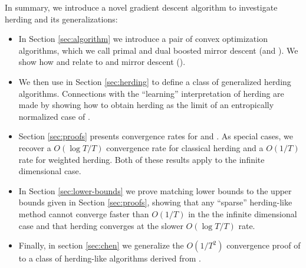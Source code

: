 \documentclass[paper.tex]{subfiles}
\begin{document}

In summary, we introduce a novel gradient descent algorithm to investigate herding and its generalizations:
\begin{itemize}
\item In Section \ref{sec:algorithm} we introduce a pair of convex optimization algorithms, which we call primal and dual boosted mirror descent (\primal and \dual). We show how \primal and \dual relate to \cgd and mirror descent (\md). 
\item We then use \dual in Section \ref{sec:herding} to define a class of generalized herding algorithms. Connections with the ``learning'' interpretation of herding are made by showing how to obtain herding as the limit of an entropically normalized case of \dual. 
\item Section \ref{sec:proofs} presents convergence rates for \primal and \dual. As special cases, we recover a $O(\log T/ T)$ convergence rate for classical herding and a $O(1/T)$ rate for weighted herding. Both of these results apply to the infinite dimensional case. 
\item In Section \ref{sec:lower-bounds} we prove matching lower bounds to the upper bounds given in Section \ref{sec:proofs}, showing that any ``sparse'' herding-like method cannot converge faster than $O(1/T)$ in the the infinite dimensional case and that herding converges at the slower $O(\log T / T)$ rate.
\item Finally, in section \ref{sec:chen} we generalize the $O(1/T^{2})$ convergence proof of \citet{Chen:2010a} to a class of herding-like algorithms derived from \bmd. 
\end{itemize}
\end{document}

